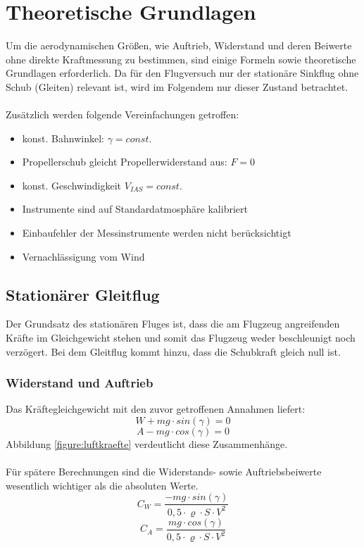 \chapter{Theoretische Grundlagen}
\label{chapter:theorie}
Um die aerodynamischen Größen, wie Auftrieb, Widerstand und deren Beiwerte ohne direkte Kraftmessung zu bestimmen, sind einige Formeln sowie theoretische Grundlagen erforderlich. Da für den Flugversuch nur der stationäre Sinkflug ohne Schub (Gleiten) relevant ist, wird im Folgendem nur dieser Zustand betrachtet. \\ \\
Zusätzlich werden folgende Vereinfachungen getroffen:
\begin{itemize}
	\item konst. Bahnwinkel: $\gamma = const.$ 
	\item Propellerschub gleicht Propellerwiderstand aus: $F=0$
	\item konst. Geschwindigkeit $V_{IAS} = const.$
	\item Instrumente sind auf Standardatmosphäre kalibriert
	\item Einbaufehler der Messinstrumente werden nicht berücksichtigt
	\item Vernachlässigung vom Wind
\end{itemize}

\vspace{1cm}
\section{Stationärer Gleitflug}
Der Grundsatz des stationären Fluges ist, dass die am Flugzeug angreifenden Kräfte im Gleichgewicht stehen und somit das Flugzeug weder beschleunigt noch verzögert. Bei dem Gleitflug kommt hinzu, dass die Schubkraft gleich null ist.
\subsection{Widerstand und Auftrieb}
Das Kräftegleichgewicht mit den zuvor getroffenen Annahmen liefert:
\begin{equation}
\label{eq:kräftegleichgewichtWiderstand}
W + mg \cdot sin(\gamma) = 0
\end{equation}
%
%
%
\begin{equation}
\label{eq:kräftegleichgewichtAuftrieb}
A - mg \cdot cos(\gamma) = 0
\end{equation}
Abbildung \ref{figure:luftkraefte} verdeutlicht diese Zusammenhänge. \\  \\
Für spätere Berechnungen sind die Widerstands- sowie Auftriebsbeiwerte wesentlich wichtiger als die absoluten Werte.
\begin{equation}
C_W = \frac{-mg \cdot sin(\gamma)}{0,5  \cdot  \varrho  \cdot  S  \cdot  V^2}
\end{equation}
\begin{equation}
C_A = \frac{mg \cdot cos(\gamma)}{0,5  \cdot  \varrho  \cdot  S  \cdot  V^2}
\end{equation}

